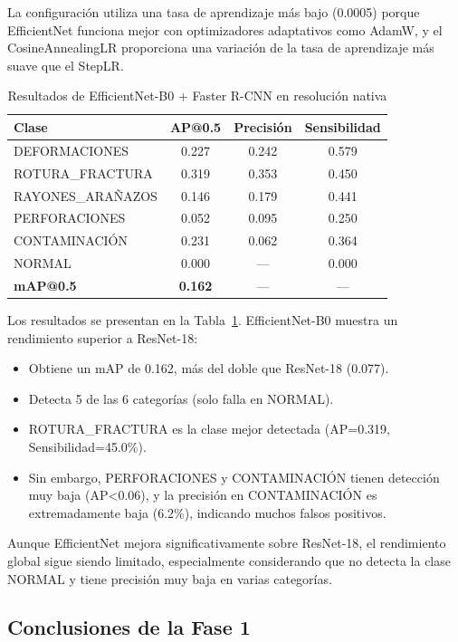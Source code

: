La configuración utiliza una tasa de aprendizaje más bajo (0.0005) porque EfficientNet funciona mejor con optimizadores adaptativos como AdamW, y el CosineAnnealingLR proporciona una variación de la tasa de aprendizaje más suave que el StepLR.

\begin{table}[htbp]
\centering
\begin{tabular}{lccc}
\toprule
\textbf{Clase} & \textbf{AP@0.5} & \textbf{Precisión} & \textbf{Sensibilidad} \\
\midrule
DEFORMACIONES & 0.227 & 0.242 & 0.579 \\
\mbox{ROTURA\_FRACTURA} & 0.319 & 0.353 & 0.450 \\
\mbox{RAYONES\_ARAÑAZOS} & 0.146 & 0.179 & 0.441 \\
PERFORACIONES & 0.052 & 0.095 & 0.250 \\
CONTAMINACIÓN & 0.231 & 0.062 & 0.364 \\
NORMAL & 0.000 & --- & 0.000 \\
\midrule
\textbf{mAP@0.5} & \textbf{0.162} & --- & --- \\
\bottomrule
\end{tabular}
\caption{Resultados de EfficientNet-B0 + Faster R-CNN en resolución nativa}
\label{tab:efficientnet_nativa}
\end{table}

Los resultados se presentan en la Tabla~\ref{tab:efficientnet_nativa}. EfficientNet-B0 muestra un rendimiento superior a ResNet-18:
\begin{itemize}
    \item Obtiene un mAP de 0.162, más del doble que ResNet-18 (0.077).
    \item Detecta 5 de las 6 categorías (solo falla en NORMAL).
    \item \mbox{ROTURA\_FRACTURA} es la clase mejor detectada (AP=0.319, Sensibilidad=45.0\%).
    \item Sin embargo, PERFORACIONES y CONTAMINACIÓN tienen detección muy baja (AP<0.06), y la precisión en CONTAMINACIÓN es extremadamente baja (6.2\%), indicando muchos falsos positivos.
\end{itemize}

Aunque EfficientNet mejora significativamente sobre ResNet-18, el rendimiento global sigue siendo limitado, especialmente considerando que no detecta la clase NORMAL y tiene precisión muy baja en varias categorías.

\subsection{Conclusiones de la Fase 1}

